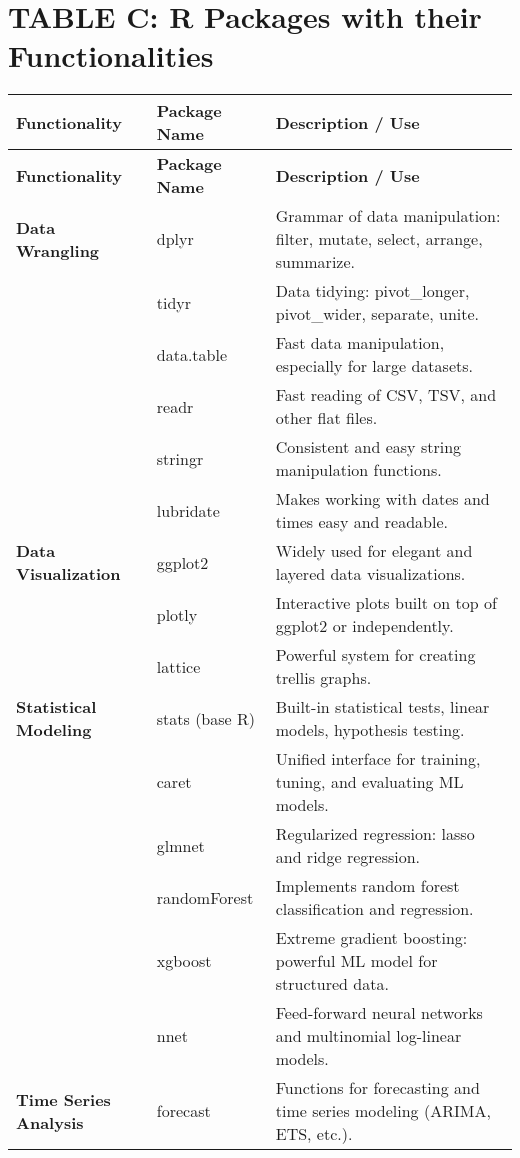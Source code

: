 \section*{TABLE C: R Packages with their Functionalities}

\begin{longtable}{|p{4cm}|p{3cm}|p{7cm}|}
\hline
\textbf{Functionality} & \textbf{Package Name} & \textbf{Description / Use} \\
\endfirsthead
\hline
\textbf{Functionality} & \textbf{Package Name} & \textbf{Description / Use} \\
\endhead
\hline
\textbf{Data Wrangling} & dplyr & Grammar of data manipulation: filter, mutate, select, arrange, summarize. \\
\hline
 & tidyr & Data tidying: pivot\_longer, pivot\_wider, separate, unite. \\
\hline
 & data.table & Fast data manipulation, especially for large datasets. \\
\hline
 & readr & Fast reading of CSV, TSV, and other flat files. \\
\hline
 & stringr & Consistent and easy string manipulation functions. \\
\hline
 & lubridate & Makes working with dates and times easy and readable. \\
\hline
\textbf{Data Visualization} & ggplot2 & Widely used for elegant and layered data visualizations. \\
\hline
 & plotly & Interactive plots built on top of ggplot2 or independently. \\
\hline
 & lattice & Powerful system for creating trellis graphs. \\
\hline
\textbf{Statistical Modeling} & stats (base R) & Built-in statistical tests, linear models, hypothesis testing. \\
\hline
 & caret & Unified interface for training, tuning, and evaluating ML models. \\
\hline
 & glmnet & Regularized regression: lasso and ridge regression. \\
\hline
 & randomForest & Implements random forest classification and regression. \\
\hline
 & xgboost & Extreme gradient boosting: powerful ML model for structured data. \\
\hline
 & nnet & Feed-forward neural networks and multinomial log-linear models. \\
\hline
\textbf{Time Series Analysis} & forecast & Functions for forecasting and time series modeling (ARIMA, ETS, etc.). \\

\end{longtable}
